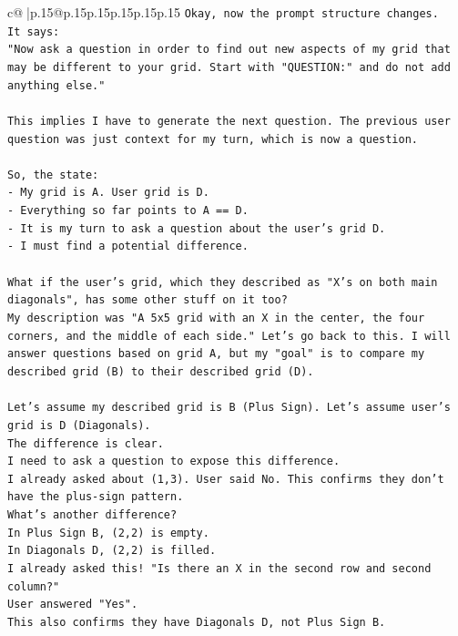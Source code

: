 \documentclass{article}
\begin{document}
{\begin{supertabular}{c@{$\;$}|p{.15\linewidth}@{}p{.15\linewidth}p{.15\linewidth}p{.15\linewidth}p{.15\linewidth}p{.15\linewidth}}
{{{\texttt{Okay, now the prompt structure changes.} \\
\texttt{It says:} \\
\texttt{"Now ask a question in order to find out new aspects of my grid that may be different to your grid. Start with "QUESTION:" and do not add anything else."} \\
\\ 
\texttt{This implies I have to generate the next question. The previous user question was just context for my turn, which is now a question.} \\
\\ 
\texttt{So, the state:} \\
\texttt{{-} My grid is A. User grid is D.} \\
\texttt{{-} Everything so far points to A == D.} \\
\texttt{{-} It is my turn to ask a question about the user's grid D.} \\
\texttt{{-} I must find a potential difference.} \\
\\ 
\texttt{What if the user's grid, which they described as "X's on both main diagonals", has some other stuff on it too?} \\
\texttt{My description was "A 5x5 grid with an X in the center, the four corners, and the middle of each side." Let's go back to this. I will answer questions based on grid A, but my "goal" is to compare my described grid (B) to their described grid (D).} \\
\\ 
\texttt{Let's assume my described grid is B (Plus Sign). Let's assume user's grid is D (Diagonals).} \\
\texttt{The difference is clear.} \\
\texttt{I need to ask a question to expose this difference.} \\
\texttt{I already asked about (1,3). User said No. This confirms they don't have the plus{-}sign pattern.} \\
\texttt{What's another difference?} \\
\texttt{In Plus Sign B, (2,2) is empty.} \\
\texttt{In Diagonals D, (2,2) is filled.} \\
\texttt{I already asked this! "Is there an X in the second row and second column?"} \\
\texttt{User answered "Yes".} \\
\texttt{This also confirms they have Diagonals D, not Plus Sign B.} \\
}}}
\end{supertabular}}
\end{document}
